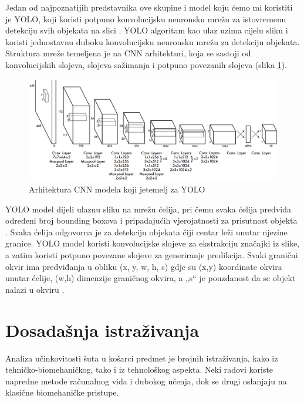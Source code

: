 \documentclass[zavrsnirad]{fer}
\begin{document}
Jedan od najpoznatijih predstavnika ove skupine i model koju ćemo mi koristiti je YOLO, koji koristi potpuno konvolucijsku neuronsku mrežu za istovremenu detekciju svih objekata na slici \cite{v7labs_yolo_2023}. 
YOLO algoritam kao ulaz uzima cijelu sliku i koristi jednostavnu duboku konvolucijsku neuronsku mrežu za detekciju objekata.
Struktura mreže temeljena je na CNN arhitekturi, koja se sastoji od konvolucijskih slojeva, slojeva sažimanja i potpuno povezanih slojeva (slika \ref{fig:yolo_architecture}).
\begin{figure}[H]
  \centering
  \includegraphics[width=\linewidth]{Figures/Tiny_yolo_architechture.png}
  \caption{Arhitektura CNN modela koji jetemelj za YOLO \cite{v7labs_yolo_2023}}
  \label{fig:yolo_architecture}
\end{figure}
YOLO model dijeli ulaznu sliku na mrežu ćelija, pri čemu svaka ćelija predviđa određeni broj bounding boxova i pripadajućih vjerojatnosti za prisutnost objekta \cite{yolov3}.
Svaka ćelija odgovorna je za detekciju objekata čiji centar leži unutar njezine granice.
YOLO model koristi konvolucijske slojeve za ekstrakciju značajki iz slike, a zatim koristi potpuno povezane slojeve za generiranje predikcija\cite{v7labs_yolo_2023}.
Svaki granični okvir ima predviđanja u obliku (x, y, w, h, s) gdje su (x,y) koordinate okvira unutar ćelije, (w,h) dimenzije graničnog okvira, a „s“ je pouzdanost da se objekt nalazi u okviru \cite{nskturad}.

\section{Dosadašnja istraživanja}
\label{pog:dosadasnja_istrazivanja}
Analiza učinkovitosti šuta u košarci predmet je brojnih istraživanja, kako iz tehničko-biomehaničkog, tako i iz tehnološkog aspekta. 
Neki radovi koriste napredne metode računalnog vida i dubokog učenja, dok se drugi oslanjaju na klasične biomehaničke pristupe.
\end{document}

